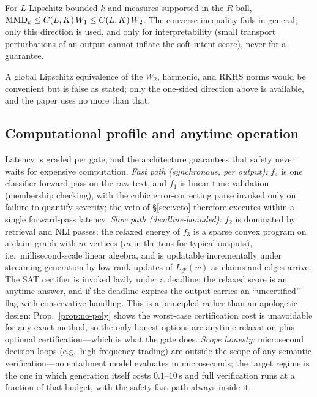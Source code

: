 \begin{proposition}
For $L$-Lipschitz bounded $k$ and measures supported in the $R$-ball,
$\mathrm{MMD}_k\le C(L,K)\,W_1\le C(L,K)\,W_2$. The converse inequality fails in
general; only this direction is used, and only for interpretability (small
transport perturbations of an output cannot inflate the soft intent score),
never for a guarantee.
\end{proposition}

A global Lipschitz equivalence of the $W_2$, harmonic, and RKHS norms would be
convenient but is false as stated; only the one-sided direction above is
available, and the paper uses no more than that.

\subsection{Computational profile and anytime operation}
\label{sec:compute}

Latency is graded per gate, and the architecture guarantees that safety never
waits for expensive computation. \emph{Fast path (synchronous, per output):}
$f_4$ is one classifier forward pass on the raw text, and $f_1$ is linear-time
validation (membership checking), with the cubic error-correcting parse
invoked only on failure to quantify severity; the veto of \S\ref{sec:veto}
therefore executes within a single forward-pass latency. \emph{Slow path
(deadline-bounded):} $f_2$ is dominated by retrieval and NLI passes; the
relaxed energy of $f_3$ is a sparse convex program on a claim graph with $m$
vertices ($m$ in the tens for typical outputs), i.e.\ millisecond-scale linear
algebra, and is updatable incrementally under streaming generation by low-rank
updates of $L_{\mathcal F}(w)$ as claims and edges arrive. The SAT certifier
is invoked lazily under a deadline: the relaxed score is an anytime answer,
and if the deadline expires the output carries an ``uncertified'' flag with
conservative handling. This is a principled rather than an apologetic design:
Prop.~\ref{prop:no-poly} shows the worst-case certification cost is
unavoidable for any exact method, so the only honest options are anytime
relaxation plus optional certification---which is what the gate does.
\emph{Scope honesty:} microsecond decision loops (e.g.\ high-frequency
trading) are outside the scope of any semantic verification---no entailment
model evaluates in microseconds; the target regime is the one in which
generation itself costs $0.1$--$10$\,s and full verification runs at a
fraction of that budget, with the safety fast path always inside it.
